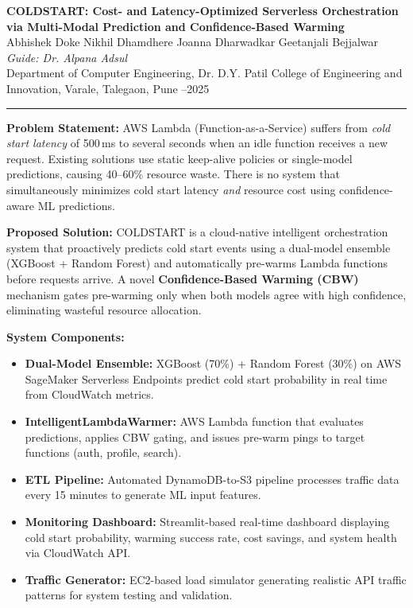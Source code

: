 \documentclass[10pt,a4paper]{article}
\begin{document}
\begin{center}
{\large\textbf{COLDSTART: Cost- and Latency-Optimized Serverless Orchestration}}\\[2pt]
{\normalsize\textbf{via Multi-Modal Prediction and Confidence-Based Warming}}\\[4pt]
\small
Abhishek Doke \quad Nikhil Dhamdhere \quad Joanna Dharwadkar \quad Geetanjali Bejjalwar\\
\textit{Guide: Dr. Alpana Adsul}\\
Department of Computer Engineering, Dr. D.Y. Patil College of Engineering and Innovation, Varale, Talegaon, Pune --2025
\end{center}

\noindent\rule{\linewidth}{0.8pt}

\smallskip
\noindent\textbf{Problem Statement:}
AWS Lambda (Function-as-a-Service) suffers from \textit{cold start latency} of 500\,ms to several seconds when an idle function receives a new request. Existing solutions use static keep-alive policies or single-model predictions, causing 40--60\% resource waste. There is no system that simultaneously minimizes cold start latency \textit{and} resource cost using confidence-aware ML predictions.

\smallskip
\noindent\textbf{Proposed Solution:}
COLDSTART is a cloud-native intelligent orchestration system that proactively predicts cold start events using a dual-model ensemble (XGBoost + Random Forest) and automatically pre-warms Lambda functions before requests arrive. A novel \textbf{Confidence-Based Warming (CBW)} mechanism gates pre-warming only when both models agree with high confidence, eliminating wasteful resource allocation.

\smallskip
\noindent\textbf{System Components:}
\begin{itemize}[leftmargin=1.4em, itemsep=1pt, topsep=1pt]
\item \textbf{Dual-Model Ensemble:} XGBoost (70\%) + Random Forest (30\%) on AWS SageMaker Serverless Endpoints predict cold start probability in real time from CloudWatch metrics.
\item \textbf{IntelligentLambdaWarmer:} AWS Lambda function that evaluates predictions, applies CBW gating, and issues pre-warm pings to target functions (auth, profile, search).
\item \textbf{ETL Pipeline:} Automated DynamoDB-to-S3 pipeline processes traffic data every 15 minutes to generate ML input features.
\item \textbf{Monitoring Dashboard:} Streamlit-based real-time dashboard displaying cold start probability, warming success rate, cost savings, and system health via CloudWatch API.
\item \textbf{Traffic Generator:} EC2-based load simulator generating realistic API traffic patterns for system testing and validation.
\end{itemize}
\end{document}
